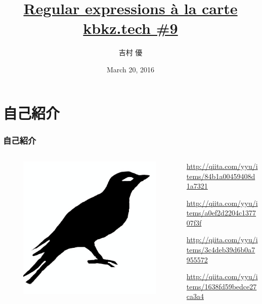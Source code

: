 \documentclass[12pt, unicode, svgnames, handout]{beamer}
\title[Regular expressions à la carte]{%
  \href{https://github.com/y-yu/regex-slide}{Regular expressions à la carte} \\
  \href{http://kbkz.connpass.com/event/26677/}{\normalsize kbkz.tech \#9}
}
\author{吉村 優}
\date{March 20, 2016}
\institute[\url{https://twitter.com/\_yyu\_}]{%
  \url{https://twitter.com/\_yyu\_}\\
  \url{http://qiita.com/yyu}\\
  \url{https://github.com/y-yu}\\
}
\begin{document}
\frame{\maketitle}

\section{自己紹介}
\begin{frame}[fragile]
  \frametitle{自己紹介}
  
  \begin{columns}
    \begin{column}{0.3\textwidth}
      \centering
      \begin{figure}
        \includegraphics[width=.7\textwidth]{img/bird2x.png}
      \end{figure}
    \end{column}
    \begin{column}{0.7\textwidth}
      \begin{Ldescription}
        \small
        \item<2->[VM型の正規表現エンジンを実装する]
          \url{http://qiita.com/yyu/items/84b1a00459408d1a7321}
        \item<3->[正規表現からLLVMへのコンパイラを実装する]
          \url{http://qiita.com/yyu/items/a0ef2d2204c137707f3f}
        \item<4->[正規表現のJITコンパイラを実装する]
          \url{http://qiita.com/yyu/items/3c4deb39d6b0a7955572}
        \item<5->[正規表現の微分でサブマッチング]
          \url{http://qiita.com/yyu/items/1638fd59bedce27ca3a4}
      \end{Ldescription}
    \end{column}
  \end{columns}
\end{frame}
\end{document}
